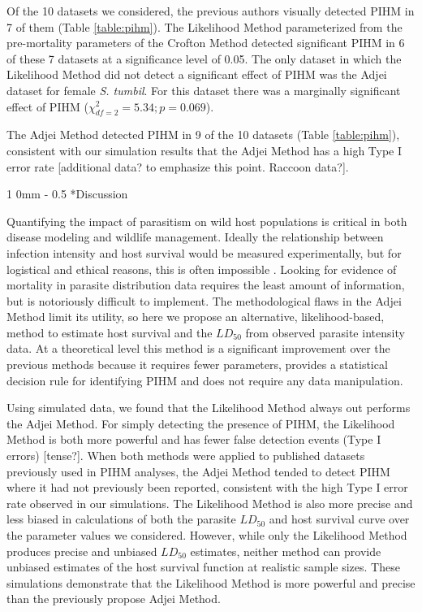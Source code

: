 \documentclass[12pt, a4paper]{article}
\makeatletter
\renewcommand{\section}{\@startsection
{section}%
{1}%
{0mm}%
{-\baselineskip}%
{0.5\baselineskip}%
{\normalfont\bf\large}} %
\makeatother
\begin{document}
Of the 10 datasets we considered, the previous authors visually detected PIHM
in 7 of them (Table \ref{table:pihm}).  The Likelihood Method parameterized
from the pre-mortality parameters of the Crofton Method detected significant
PIHM in 6 of these 7 datasets at a significance level of 0.05.  The only
dataset in which the Likelihood Method did not detect a significant effect of PIHM was the Adjei dataset
for female \emph{S. tumbil}.  For this dataset there was a marginally significant effect
of PIHM ($\chi^2_{df=2} = 5.34; p = 0.069$).

The Adjei Method detected PIHM in 9 of the 10 datasets (Table \ref{table:pihm}), consistent with our simulation results that the Adjei Method has a high Type I error rate [additional data? to emphasize this point. Raccoon data?].

\section*{Discussion}


Quantifying the impact of parasitism on wild host populations is critical in
both disease modeling and wildlife management. Ideally the relationship between
infection intensity and host survival would be measured experimentally, but for
logistical and ethical reasons, this is often impossible \citep{McCallum2000a}.
Looking for evidence of mortality in parasite distribution data requires the
least amount of information, but is notoriously difficult to implement. The
methodological flaws in the Adjei Method limit its utility, so here we propose
an alternative, likelihood-based, method to estimate host survival and the
$LD_{50}$ from observed parasite intensity data.  At a theoretical level this
method is a significant improvement over the previous methods because it requires fewer parameters,
provides a statistical decision rule for identifying PIHM and does not require
any data manipulation.

Using simulated data, we found that the Likelihood Method always out performs the Adjei Method. For simply detecting the presence of PIHM, the Likelihood
Method is both more powerful and has fewer false detection events (Type I
errors) [tense?].  When both methods were applied to published datasets previously used
in PIHM analyses, the Adjei Method tended to detect PIHM where it had not previously been
reported, consistent with the high Type I error rate observed in our
simulations. The Likelihood Method is also more precise and less
biased in calculations of both the parasite $LD_{50}$ and host survival curve over the parameter values we considered.
However, while only the Likelihood Method produces precise and unbiased $LD_{50}$
estimates, neither method can provide unbiased estimates of the host survival
function at realistic sample sizes.  These simulations demonstrate that
the Likelihood Method is more powerful and precise than the previously propose Adjei Method.
\end{document}
